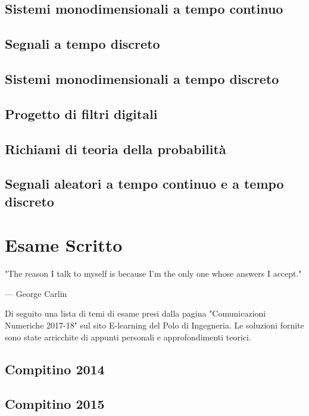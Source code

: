 \documentclass[12pt,oneside,openany]{memoir}
\numberwithin{equation}{subsection}
\begin{document}
\newpage
\section{Sistemi monodimensionali a tempo continuo}

\newpage
\section{Segnali a tempo discreto}

\newpage
\section{Sistemi monodimensionali a tempo discreto}

\newpage
\section{Progetto di filtri digitali}

\newpage
\section{Richiami di teoria della probabilit\`a}

\newpage
\section{Segnali aleatori a tempo continuo e a tempo discreto}


\chapter{Esame Scritto}
\epigraph{"The reason I talk to myself is because I'm the only one whose answers I accept."}{--- \textup{George Carlin}}

Di seguito una lista di temi di esame presi dalla pagina "Comunicazioni Numeriche 2017-18" sul sito E-learning del Polo di Ingegneria. Le soluzioni fornite sono state arricchite di appunti personali e approfondimenti teorici.

\newpage
\section{Compitino 2014}

\newpage
\section{Compitino 2015}
\end{document}
